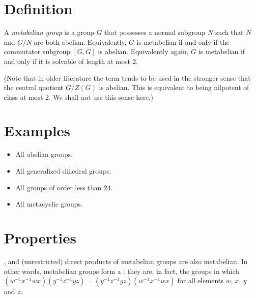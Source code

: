 \documentclass[12pt]{article}
\begin{document}

\section*{Definition}

A \emph{metabelian group} is a group $G$ that possesses a normal subgroup $N$ such that $N$ and $G/N$ are both abelian. 
Equivalently, $G$ is metabelian if and only if the commutator subgroup $[G,G]$ is abelian. 
Equivalently again, $G$ is metabelian if and only if it is solvable of length at most $2$.

(Note that in older literature the term tends to be used in the stronger sense that the central quotient $G/Z(G)$ is abelian. This is equivalent to being nilpotent of class at most $2$. We shall not use this sense here.)

\section*{Examples}

\begin{itemize}
\item All abelian groups.
\item All generalized dihedral groups.
\item All groups of order less than $24$.
\item All metacyclic groups.
\end{itemize}

\section*{Properties}

,  and (unrestricted) direct products of metabelian groups are also metabelian.
In other words, metabelian groups form a ;
they are, in fact, the groups in which $(w^{-1}x^{-1}wx)(y^{-1}z^{-1}yz)=(y^{-1}z^{-1}yz)(w^{-1}x^{-1}wx)$ for all elements $w$, $x$, $y$ and $z$.
\end{document}
